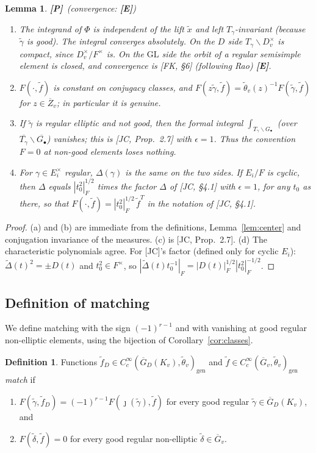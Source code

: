 \documentclass[12pt]{article}
\newcommand{\ov}[1]{\overline{#1}}
\newcommand{\eps}{\epsilon}
\newcommand{\gen}{\mathrm{gen}}
\newcommand{\GL}{\mathrm{GL}}
\newcommand{\Gb}{\ov{G}}
\newcommand{\Zb}{\ov{Z}}
\newcommand{\GDb}{\ov{G}_D}
\newcommand{\jj}{\jmath}
\newcommand{\Pv}{\textbf{[P]}}
\newcommand{\Ev}{\textbf{[E]}}
\theoremstyle{plain}
\newtheorem{lemma}[theorem]{Lemma}
\theoremstyle{definition}
\newtheorem{definition}[theorem]{Definition}
\begin{document}
\begin{lemma}\label{lem:oiprops}\Pv\ (convergence: \Ev)
\begin{enumerate}[label=(\alph*)]
\item The integrand of $\Phi$ is independent of the lift $\tilde x$ and left $T_\gamma$-invariant (because $\tilde\gamma$ is good). The integral converges absolutely. On the $D$ side $T_\gamma\backslash D_v^\times$ is compact, since $D_v^\times/F^\times$ is. On the $\GL$ side the orbit of a regular semisimple element is closed, and convergence is [FK, \S6] (following Rao) \Ev.
\item $F(\cdot,\tilde f)$ is constant on conjugacy classes, and $F(z\tilde\gamma,\tilde f)=\tilde\theta_v(z)^{-1}F(\tilde\gamma,\tilde f)$ for $z\in\Zb_v$; in particular it is genuine.
\item If $\tilde\gamma$ is regular elliptic and not good, then the formal integral $\int_{T_\gamma\backslash G_\bullet}$ (over $\ov{T_\gamma}\backslash\ov{G_\bullet}$) vanishes; this is [JC, Prop.~2.7] with $\eps=1$. Thus the convention $F=0$ at non-good elements loses nothing.
\item For $\gamma\in E_i^\times$ regular, $\Delta(\gamma)$ is the same on the two sides. If $E_i/F$ is cyclic, then $\Delta$ equals $|t_0^2|_F^{1/2}$ times the factor $\Delta$ of [JC, \S4.1] with $\eps=1$, for any $t_0$ as there, so that $F(\cdot,\tilde f)=|t_0^2|_F^{1/2}\,\tilde f^{T}$ in the notation of [JC, \S4.1].
\end{enumerate}
\end{lemma}
\begin{proof}
(a) and (b) are immediate from the definitions, Lemma~\ref{lem:center} and conjugation invariance of the measures. (c) is [JC, Prop.~2.7]. (d) The characteristic polynomials agree. For [JC]'s factor (defined only for cyclic $E_i$): $\tilde\Delta(t)^2=\pm D(t)$ and $t_0^2\in F^\times$, so $|\tilde\Delta(t)t_0^{-1}|_F=|D(t)|_F^{1/2}|t_0^2|_F^{-1/2}$.
\end{proof}

\subsection{Definition of matching}\label{subsec:defmatch}
We define matching with the sign $(-1)^{r-1}$ and with vanishing at good regular non-elliptic elements, using the bijection of Corollary~\ref{cor:classes}.

\begin{definition}\label{def:matching}
Functions $\tilde f_D\in C_c^\infty(\GDb(K_v),\tilde\theta_v)_\gen$ and $\tilde f\in C_c^\infty(\Gb_v,\tilde\theta_v)_\gen$ \emph{match} if
\begin{enumerate}[label=(M\arabic*)]
\item $F(\tilde\gamma,\tilde f_D)=(-1)^{r-1}F(\jj(\tilde\gamma),\tilde f)$ for every good regular $\tilde\gamma\in\GDb(K_v)$, and
\item $F(\tilde\delta,\tilde f)=0$ for every good regular non-elliptic $\tilde\delta\in\Gb_v$.
\end{enumerate}
\end{definition}
\end{document}
